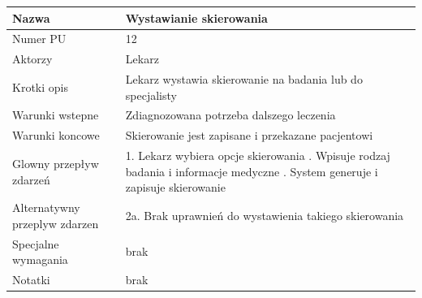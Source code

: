 \documentclass{article}
\begin{document}
\vspace{1cm}

\noindent
\begin{tabular}{|m{10em}|m{30em}|}
        \hline
        Nazwa & Wystawianie skierowania \\
        \hline
        Numer PU & 12\\
        \hline
        Aktorzy & Lekarz\\
        \hline
        Krotki opis & Lekarz wystawia skierowanie na badania lub do specjalisty\\
        \hline
        Warunki wstepne & Zdiagnozowana potrzeba dalszego leczenia\\
        \hline
        Warunki koncowe & Skierowanie jest zapisane i przekazane pacjentowi\\
        \hline
        Glowny przepływ zdarzeń & 1. Lekarz wybiera opcje skierowania \newline
                                 2. Wpisuje rodzaj badania i informacje medyczne \newline
                                 3. System generuje i zapisuje skierowanie  \\
        \hline
        Alternatywny przeplyw zdarzen &  2a. Brak uprawnień do wystawienia takiego skierowania\\
        \hline
        Specjalne wymagania & brak\\
        \hline
        Notatki& brak\\
        \hline
\end{tabular}
\end{document}
